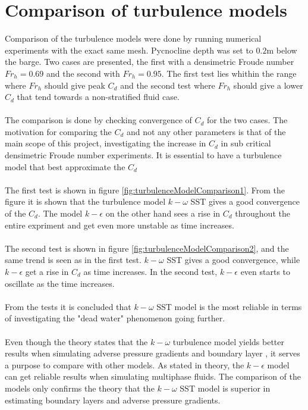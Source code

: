 \documentclass[a4paper, 12pt]{report}
\begin{document}
\section{Comparison of turbulence models}
Comparison of the turbulence models were done by running numerical experiments with the exact same mesh. Pycnocline depth was set to $0.2$m below the barge. Two cases are presented, the first with a densimetric Froude number $Fr_h=0.69$ and the second with $Fr_h=0.95$. The first test lies whithin the range where $Fr_h$ should give peak $C_d$ and the second test where $Fr_h$ should give a lower $C_d$ that tend towards a non-stratified fluid case.\\
\\
The comparison is done by checking convergence of $C_d$ for the two cases. The motivation for comparing the $C_d$ and not any other parameters is that of the main scope of this project, investigating the increase in $C_d$ in sub critical densimetric Froude number experiments. It is essential to have a turbulence model that best approximate the $C_d$ \\
\\
The first test is shown in figure \ref{fig:turbulenceModelComparison1}. From the figure it is shown that the turbulence model $k-\omega$ SST gives a good convergence of the $C_d$. The model $k-\epsilon$ on the other hand sees a rise in $C_d$ throughout the entire expriment and get even more unstable as time increases.\\
\\
The second test is shown in figure \ref{fig:turbulenceModelComparison2}, and the same trend is seen as in the first test. $k-\omega$ SST gives a good convergence, while $k-\epsilon$ get a rise in $C_d$ as time increases. In the second test, $k-\epsilon$ even starts to oscillate as the time increases.\\
\\
From the tests it is concluded that $k-\omega$ SST model is the most reliable in terms of investigating the "dead water" phenomenon going further.\\
\\
Even though the theory states that the $k-\omega$ turbulence model yields better results when simulating adverse pressure gradients and boundary layer \cite{CFD}, it serves a purpose to compare with other models. As stated in theory, the $k-\epsilon$ model can get reliable results when simulating multiphase fluids. The comparison of the models only confirms the theory that the $k-\omega$ SST model is superior in estimating boundary layers and adverse pressure gradients.\\
\end{document}
